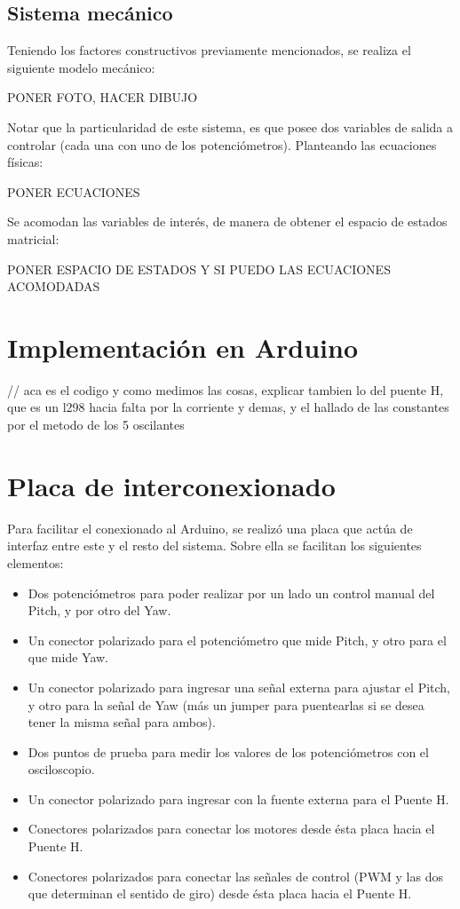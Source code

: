 \documentclass{article}
\begin{document}
\subsection{Sistema mecánico}
Teniendo los factores constructivos previamente mencionados, se realiza el siguiente modelo mecánico:

PONER FOTO, HACER DIBUJO

Notar que la particularidad de este sistema, es que posee dos variables de salida a controlar (cada una con uno de los potenciómetros). Planteando las ecuaciones físicas:

PONER ECUACIONES

Se acomodan las variables de interés, de manera de obtener el espacio de estados matricial:

PONER ESPACIO DE ESTADOS Y SI PUEDO LAS ECUACIONES ACOMODADAS 

\newpage

\section{Implementación en Arduino}
// aca es el codigo y como medimos las cosas, explicar tambien lo del puente H, que es un l298 hacia falta por la corriente y demas, y el hallado de las constantes por el metodo de los 5 oscilantes

\newpage

\section{Placa de interconexionado}

Para facilitar el conexionado al Arduino, se realizó una placa que actúa de interfaz entre este y el resto del sistema. Sobre ella se facilitan los siguientes elementos:

\begin{itemize}
\item Dos potenciómetros para poder realizar por un lado un control manual del Pitch, y por otro del Yaw.
\item Un conector polarizado para el potenciómetro que mide Pitch, y otro para el que mide Yaw.
\item Un conector polarizado para ingresar una señal externa para ajustar el Pitch, y otro para la señal de Yaw (más un jumper para puentearlas si se desea tener la misma señal para ambos).
\item Dos puntos de prueba para medir los valores de los potenciómetros con el osciloscopio.
\item Un conector polarizado para ingresar con la fuente externa para el Puente H.
\item Conectores polarizados para conectar los motores desde ésta placa hacia el Puente H.
\item Conectores polarizados para conectar las señales de control (PWM y las dos que determinan el sentido de giro) desde ésta placa hacia el Puente H.
\end{itemize}
\end{document}
